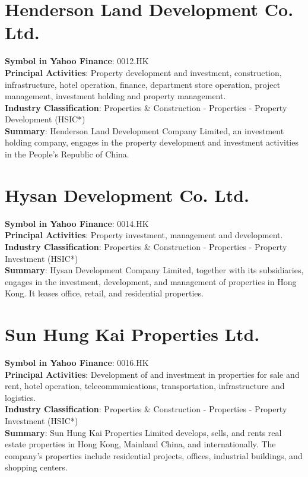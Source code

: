 \section{Henderson Land Development Co. Ltd.}
\textbf{Symbol in Yahoo Finance}: 0012.HK\\
\textbf{Principal Activities}: Property development and investment, construction, infrastructure, hotel operation, finance, department store operation, project management, investment holding and property management.\\
\textbf{Industry Classification}: Properties \& Construction - Properties - Property Development (HSIC*)\\
\textbf{Summary}: Henderson Land Development Company Limited, an investment holding company, engages in the property development and investment activities in the People's Republic of China.


\section{Hysan Development Co. Ltd.}
\textbf{Symbol in Yahoo Finance}: 0014.HK\\
\textbf{Principal Activities}: Property investment, management and development.\\
\textbf{Industry Classification}: Properties \& Construction - Properties - Property Investment (HSIC*)\\
\textbf{Summary}: Hysan Development Company Limited, together with its subsidiaries, engages in the investment, development, and management of properties in Hong Kong. It leases office, retail, and residential properties.


\section{Sun Hung Kai Properties Ltd.}
\textbf{Symbol in Yahoo Finance}: 0016.HK\\
\textbf{Principal Activities}: Development of and investment in properties for sale and rent, hotel operation, telecommunications, transportation, infrastructure and logistics.\\
\textbf{Industry Classification}: Properties \& Construction - Properties - Property Investment (HSIC*)\\
\textbf{Summary}: Sun Hung Kai Properties Limited develops, sells, and rents real estate properties in Hong Kong, Mainland China, and internationally. The company's properties include residential projects, offices, industrial buildings, and shopping centers.


